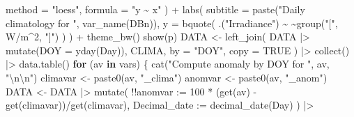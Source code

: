 \documentclass[
  10pt,
  a4paper,oneside]{article}
\newenvironment{Shaded}{\begin{snugshade}}{\end{snugshade}}
\newcommand{\AttributeTok}[1]{\textcolor[rgb]{0.77,0.63,0.00}{#1}}
\newcommand{\ConstantTok}[1]{\textcolor[rgb]{0.00,0.00,0.00}{#1}}
\newcommand{\ControlFlowTok}[1]{\textcolor[rgb]{0.13,0.29,0.53}{\textbf{#1}}}
\newcommand{\DecValTok}[1]{\textcolor[rgb]{0.00,0.00,0.81}{#1}}
\newcommand{\ErrorTok}[1]{\textcolor[rgb]{0.64,0.00,0.00}{\textbf{#1}}}
\newcommand{\FunctionTok}[1]{\textcolor[rgb]{0.00,0.00,0.00}{#1}}
\newcommand{\NormalTok}[1]{#1}
\newcommand{\OtherTok}[1]{\textcolor[rgb]{0.56,0.35,0.01}{#1}}
\newcommand{\SpecialCharTok}[1]{\textcolor[rgb]{0.00,0.00,0.00}{#1}}
\newcommand{\StringTok}[1]{\textcolor[rgb]{0.31,0.60,0.02}{#1}}
\begin{document}
\begin{Shaded}
\begin{Highlighting}[]
                \AttributeTok{method =} \StringTok{"loess"}\NormalTok{, }\AttributeTok{formula =} \StringTok{"y \textasciitilde{} x"}
\NormalTok{            ) }\SpecialCharTok{+}
            \FunctionTok{labs}\NormalTok{(}
                \AttributeTok{subtitle =} \FunctionTok{paste}\NormalTok{(}\StringTok{"Daily climatology for "}\NormalTok{, }\FunctionTok{var\_name}\NormalTok{(DBn)),}
                \AttributeTok{y =} \FunctionTok{bquote}\NormalTok{(}
\NormalTok{                  .(}\StringTok{"Irradiance"}\NormalTok{) }\SpecialCharTok{\textasciitilde{}}
                    \ErrorTok{\textasciitilde{}}\FunctionTok{group}\NormalTok{(}\StringTok{"["}\NormalTok{, W}\SpecialCharTok{/}\NormalTok{m}\SpecialCharTok{\^{}}\DecValTok{2}\NormalTok{, }\StringTok{"]"}\NormalTok{)}
\NormalTok{              )}
\NormalTok{            ) }\SpecialCharTok{+}
            \FunctionTok{theme\_bw}\NormalTok{()}
        \FunctionTok{show}\NormalTok{(p)}
\NormalTok{        DATA }\OtherTok{\textless{}{-}} \FunctionTok{left\_join}\NormalTok{(}
\NormalTok{            DATA }\SpecialCharTok{|\textgreater{}}
                \FunctionTok{mutate}\NormalTok{(}\AttributeTok{DOY =} \FunctionTok{yday}\NormalTok{(Day)),}
\NormalTok{            CLIMA, }\AttributeTok{by =} \StringTok{"DOY"}\NormalTok{, }\AttributeTok{copy =} \ConstantTok{TRUE}
\NormalTok{        ) }\SpecialCharTok{|\textgreater{}}
            \FunctionTok{collect}\NormalTok{() }\SpecialCharTok{|\textgreater{}}
            \FunctionTok{data.table}\NormalTok{()}
        \ControlFlowTok{for}\NormalTok{ (av }\ControlFlowTok{in}\NormalTok{ vars) \{}
            \FunctionTok{cat}\NormalTok{(}\StringTok{"Compute anomaly by DOY for "}\NormalTok{, av, }\StringTok{"}\SpecialCharTok{\textbackslash{}n\textbackslash{}n}\StringTok{"}\NormalTok{)}
\NormalTok{            climavar }\OtherTok{\textless{}{-}} \FunctionTok{paste0}\NormalTok{(av, }\StringTok{"\_clima"}\NormalTok{)}
\NormalTok{            anomvar }\OtherTok{\textless{}{-}} \FunctionTok{paste0}\NormalTok{(av, }\StringTok{"\_anom"}\NormalTok{)}
\NormalTok{            DATA }\OtherTok{\textless{}{-}}\NormalTok{ DATA }\SpecialCharTok{|\textgreater{}}
                \FunctionTok{mutate}\NormalTok{(}
                  \SpecialCharTok{!!}\AttributeTok{anomvar :=} \DecValTok{100} \SpecialCharTok{*}\NormalTok{ (}\FunctionTok{get}\NormalTok{(av) }\SpecialCharTok{{-}}
                    \FunctionTok{get}\NormalTok{(climavar))}\SpecialCharTok{/}\FunctionTok{get}\NormalTok{(climavar),}
                  \AttributeTok{Decimal\_date :=} \FunctionTok{decimal\_date}\NormalTok{(Day)}
\NormalTok{              ) }\SpecialCharTok{|\textgreater{}}

\end{Highlighting}
\end{Shaded}
\end{document}
